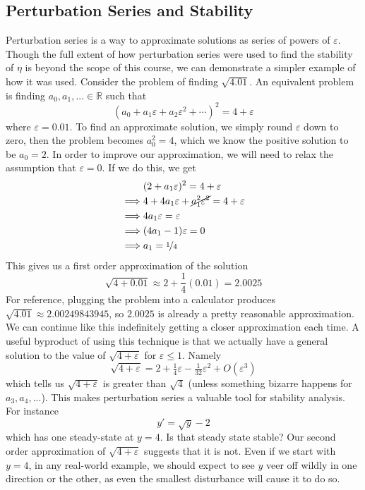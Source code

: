 \documentclass{article}
\begin{document}
\subsection{Perturbation Series and Stability}
Perturbation series is a way to approximate solutions as series of powers of $\varepsilon$. Though the full extent of how perturbation series were used to find the stability of $\eta$ is beyond the scope of this course, we can demonstrate a simpler example of how it was used. Consider the problem of finding $\sqrt{4.01}$. An equivalent problem is finding $a_0,a_1,...\in\mathbb R$ such that
\[
    (a_0+a_1\varepsilon+a_2\varepsilon^2+\cdots)^2=4+\varepsilon
\]
where $\varepsilon=0.01$. To find an approximate solution, we simply round $\varepsilon$ down to zero, then the problem becomes $a_0^2=4$, which we know the positive solution to be $a_0=2$. In order to improve our approximation, we will need to relax the assumption that $\varepsilon=0$. If we do this, we get
\begin{align*}
    &(2+a_1\varepsilon)^2=4+\varepsilon\\
    \implies& 4+4a_1\varepsilon+\cancel{a_1^2\varepsilon^2}=4+\varepsilon\\
    \implies& 4a_1\varepsilon=\varepsilon\\
    \implies& (4a_1-1)\varepsilon =0\\
    \implies& a_1=\nicefrac{1}{4}
\end{align*}
This gives us a first order approximation of the solution
\[
    \sqrt{4+0.01}\approx 2+\frac 14(0.01)=2.0025
\]
For reference, plugging the problem into a calculator produces $\sqrt{4.01}\approx 2.00249843945$, so $2.0025$ is already a pretty reasonable approximation. We can continue like this indefinitely getting a closer approximation each time. A useful byproduct of using this technique is that we actually have a general solution to the value of $\sqrt{4+\varepsilon}$ for $\varepsilon\le 1$. Namely
\[
    \sqrt{4+\varepsilon}=2+\tfrac 14\varepsilon-\tfrac 1{32}\varepsilon^2+O(\varepsilon^3)
\]
which tells us $\sqrt{4+\varepsilon}$ is greater than $\sqrt{4}$ (unless something bizarre happens for $a_3,a_4,...$). This makes perturbation series a valuable tool for stability analysis. For instance
\[
    y'=\sqrt y-2
\]
which has one steady-state at $y=4$. Is that steady state stable? Our second order approximation of $\sqrt{4+\varepsilon}$ suggests that it is not. Even if we start with $y=4$, in any real-world example, we should expect to see $y$ veer off wildly in one direction or the other, as even the smallest disturbance will cause it to do so.
\end{document}
